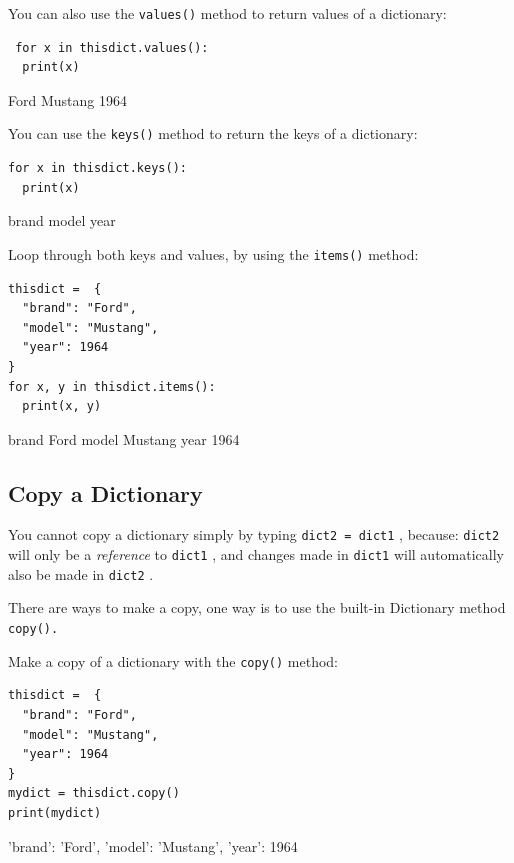 \documentclass[12pt,a4paper]{article}
\newcommand{\code}[1]{%
	\colorbox{backcolour}{\lstinline{#1}}%
}
\newcommand{\lcode}[1]{%
	\lstinline{#1}%
}
\begin{document}
\begin{ebox}
You can also use the \lcode{values()} method to return values of a dictionary:
	\begin{lstlisting}
 for x in thisdict.values():
  print(x)
	\end{lstlisting}
\tcblower
	\begin{vercode}
Ford
Mustang
1964
	\end{vercode}
\end{ebox}

\begin{ebox}
You can use the \lcode{keys()} method to return the keys of a dictionary:
	\begin{lstlisting}
for x in thisdict.keys():
  print(x)
	\end{lstlisting}
\tcblower
	\begin{vercode}
brand
model
year
	\end{vercode}
\end{ebox}

\begin{ebox}
Loop through both keys and values, by using the \lcode{items()} method:
	\begin{lstlisting}
thisdict =	{
  "brand": "Ford",
  "model": "Mustang",
  "year": 1964
}
for x, y in thisdict.items():
  print(x, y)
	\end{lstlisting}
\tcblower
	\begin{vercode}
brand Ford
model Mustang
year 1964
	\end{vercode}
\end{ebox}
\subsection{Copy a Dictionary}

You cannot copy a dictionary simply by typing \code{dict2 = dict1}, because:
\code{dict2} will only be a \textit{reference} to \code{dict1}, and changes
made in \code{dict1} will automatically also be made in \code{dict2}.

There are ways to make a copy, one way is to use the built-in Dictionary method
\code{copy().}

\begin{ebox}
Make a copy of a dictionary with the \lcode{copy()} method:
	\begin{lstlisting}
thisdict =	{
  "brand": "Ford",
  "model": "Mustang",
  "year": 1964
}
mydict = thisdict.copy()
print(mydict)
	\end{lstlisting}
\tcblower
	\begin{vercode}
{'brand': 'Ford', 'model': 'Mustang', 'year': 1964}
	\end{vercode}
\end{ebox}
\end{document}
